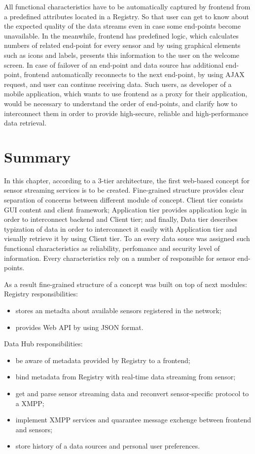  All functional characteristics have to be automatically captured by frontend from a predefined attributes located in a Registry. So that user can get to know about the expected quality of the data streams even in case some end-points become unavailable. In the meanwhile, frontend has predefined logic, which calculates numbers of related end-point for every sensor and by using graphical elements such as icons and labels, presents this information to the user on the welcome screen. In case of failover of an end-point and data source has additional end-point, frontend automatically  reconnects to the next end-point, by using AJAX request, and user can continue receiving data. Such users, as developer of a mobile application, which wants to use frontend as a proxy for their application, would be necessary to understand the order of end-points, and clarify how to interconnect them in order to provide high-secure, reliable and high-performance data retrieval.

\section{Summary}
	In this chapter, according to a 3-tier architecture, the first web-based concept for sensor streaming services is to be created. Fine-grained structure provides clear separation of concerns between different module of concept. Client tier consists GUI content and client framework; Application tier provides application logic in order to interconnect backend and Client tier; and finally, Data tier describes typization of data in order to interconnect it  easily  with Application tier and visually retrieve it by using Client tier. To an every data souce was assigned such functional characteristics as reliability, perfomance and security level of information. Every characteristics rely on a number of responsible for sensor end-points. 

    As a result fine-grained structure of a concept was built on top of next modules: 
 Registry responsibilities:
  \begin{itemize}
  \item stores an metadta about available sensors registered in the network;
  \item provides Web API by using JSON format.
  \end{itemize}
  Data Hub responsibilities:
  \begin{itemize}
    \item be aware of metadata provided by Registry to a frontend;
    \item bind metadata from Registry with real-time data streaming from sensor;
    \item get and parse sensor streaming data and reconvert sensor-specific protocol to a XMPP;
    \item implement XMPP services and quarantee message exchenge between frontend and sensors;
    \item store history of a data sources and personal user preferences.
  \end{itemize}

